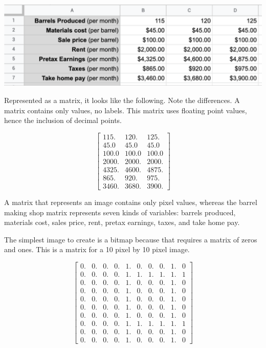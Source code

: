 \includegraphics[width=1.0\textwidth]{spreadsheet.png}

Represented as a matrix, it looks like the following. Note the differences. A matrix contains only values, no labels. This matrix uses floating point values, hence the inclusion of decimal points. 

$$\begin{bmatrix}
115. & 120. & 125.\\
45.0 & 45.0 & 45.0\\
100.0 & 100.0 & 100.0\\
2000. & 2000. & 2000.\\
4325. & 4600. & 4875.\\
865. & 920. & 975.\\
3460. & 3680. & 3900.
\end{bmatrix}$$
 
A matrix that represents an image contains only pixel values, whereas the barrel making shop matrix represents seven kinds of variables: barrels produced, materials cost, sales price, rent, pretax earnings, taxes, and take home pay. 

The simplest image to create is a bitmap because that requires a matrix of zeros and ones. This is a matrix for a 10 pixel by 10 pixel image.

$$\begin{bmatrix}
0. & 0. & 0. & 0. & 1. & 0. & 0. & 0. & 1. & 0\\
0. & 0. & 0. & 0. & 1. & 1. & 1. & 1. & 1. & 1\\
0. & 0. & 0. & 0. & 1. & 0. & 0. & 0. & 1. & 0\\
0. & 0. & 0. & 0. & 1. & 0. & 0. & 0. & 1. & 0\\
0. & 0. & 0. & 0. & 1. & 0. & 0. & 0. & 1. & 0\\
0. & 0. & 0. & 0. & 1. & 0. & 0. & 0. & 1. & 0\\
0. & 0. & 0. & 0. & 1. & 0. & 0. & 0. & 1. & 0\\
0. & 0. & 0. & 0. & 1. & 1. & 1. & 1. & 1. & 1\\
0. & 0. & 0. & 0. & 1. & 0. & 0. & 0. & 1. & 0\\
0. & 0. & 0. & 0. & 1. & 0. & 0. & 0. & 1. & 0
\end{bmatrix}$$

